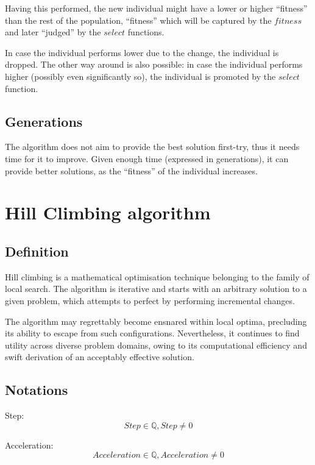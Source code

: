 \documentclass[conference]{IEEEtran}
\begin{document}
Having this performed, the new individual might have a lower or higher ``fitness'' than the rest of the population,
``fitness'' which will be captured by the $fitness$ and later ``judged'' by the $select$ functions.

In case the individual performs lower due to the change, the individual is dropped. The other way around is also possible:
in case the individual performs higher (possibly even significantly so), the individual is promoted by the $select$ function.

\subsection{Generations}
The algorithm does not aim to provide the best solution first-try, thus it needs time for it to improve. Given enough time
(expressed in generations), it can provide better solutions, as the ``fitness'' of the individual increases.

\section{Hill Climbing algorithm}

\subsection{Definition}
Hill climbing is a mathematical optimisation technique belonging to the family of local search. The algorithm is iterative
and starts with an arbitrary solution to a given problem, which attempts to perfect by performing incremental changes.

The algorithm may regrettably become ensnared within local optima, precluding its ability to escape from such configurations.
Nevertheless, it continues to find utility across diverse problem domains, owing to its computational efficiency and swift derivation of an acceptably effective solution.

\subsection{Notations}
Step:
\begin{equation} Step \in \mathbb{Q}, Step \ne 0 \end{equation}

Acceleration:
\begin{equation} Acceleration \in \mathbb{Q}, Acceleration \ne 0 \end{equation}
\end{document}
